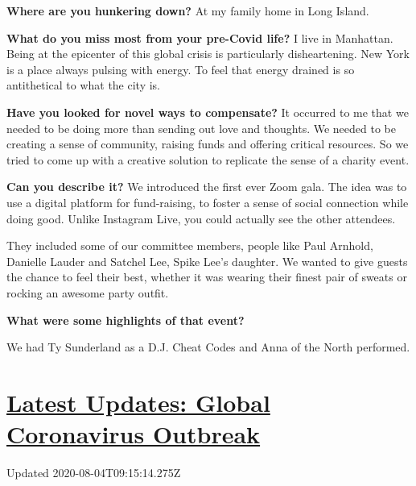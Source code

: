 \textbf{Where are you hunkering down?} At my family home in Long Island.

\textbf{What do you miss most from your pre-Covid life?} I live in
Manhattan. Being at the epicenter of this global crisis is particularly
disheartening. New York is a place always pulsing with energy. To feel
that energy drained is so antithetical to what the city is.

\textbf{Have you looked for novel ways to compensate?} It occurred to me
that we needed to be doing more than sending out love and thoughts. We
needed to be creating a sense of community, raising funds and offering
critical resources. So we tried to come up with a creative solution to
replicate the sense of a charity event.

\textbf{Can you describe it?} We introduced the first ever Zoom gala.
The idea was to use a digital platform for fund-raising, to foster a
sense of social connection while doing good. Unlike Instagram Live, you
could actually see the other attendees.

They included some of our committee members, people like Paul Arnhold,
Danielle Lauder and Satchel Lee, Spike Lee's daughter. We wanted to give
guests the chance to feel their best, whether it was wearing their
finest pair of sweats or rocking an awesome party outfit.

\textbf{What were some highlights of that event?}

We had Ty Sunderland as a D.J. Cheat Codes and Anna of the North
performed.

\hypertarget{latest-updates-global-coronavirus-outbreak}{%
\section{\texorpdfstring{\href{https://www.nytimes3xbfgragh.onion/2020/08/04/world/coronavirus-covid-19.html?action=click\&pgtype=Article\&state=default\&region=MAIN_CONTENT_1\&context=storylines_live_updates}{Latest
Updates: Global Coronavirus
Outbreak}}{Latest Updates: Global Coronavirus Outbreak}}\label{latest-updates-global-coronavirus-outbreak}}

Updated 2020-08-04T09:15:14.275Z


